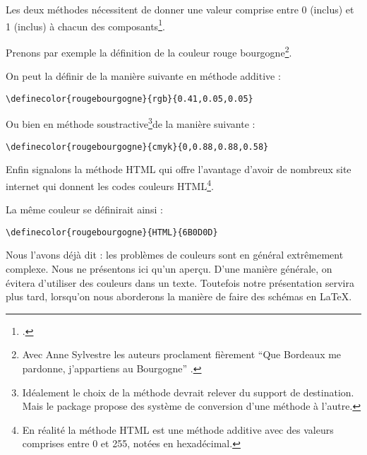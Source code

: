 Les deux méthodes nécessitent de donner une valeur comprise entre 0 (inclus) et 1 (inclus) à chacun des composants\footcite[On pourra trouver une série de code couleur sur le site]{codecouleur}.



Prenons par exemple la définition de la couleur \textcolor{rougebourgogne}{rouge bourgogne}\footnote{Avec Anne Sylvestre les auteurs proclament fièrement \enquote{Que Bordeaux me pardonne, j’appartiens au Bourgogne} \parencite{romaneconti}.}.

On peut la définir de la manière suivante en méthode additive :
\begin{verbatim}
\definecolor{rougebourgogne}{rgb}{0.41,0.05,0.05}
\end{verbatim}

Ou bien en méthode soustractive\footnote{Idéalement le choix de  la méthode devrait relever du support de destination. Mais le package  propose des système de conversion d'une méthode à l'autre.}de la manière suivante :
\begin{verbatim}
\definecolor{rougebourgogne}{cmyk}{0,0.88,0.88,0.58}
\end{verbatim}

Enfin signalons la méthode HTML qui offre l'avantage d'avoir de nombreux site internet qui donnent les codes couleurs HTML\footnote{En réalité la méthode HTML est une méthode additive avec des valeurs comprises entre 0 et 255, notées en hexadécimal.}.

La même couleur se définirait ainsi :

\begin{verbatim}
\definecolor{rougebourgogne}{HTML}{6B0D0D}
\end{verbatim}



\begin{attention}
	Nous l'avons déjà dit : les problèmes de couleurs sont en général extrêmement complexe. Nous ne présentons ici qu'un aperçu. D'une manière générale, on évitera d'utiliser des couleurs dans un texte. Toutefois notre présentation servira plus tard, lorsqu'on nous aborderons la manière de faire des schémas en LaTeX.
	
\end{attention}



